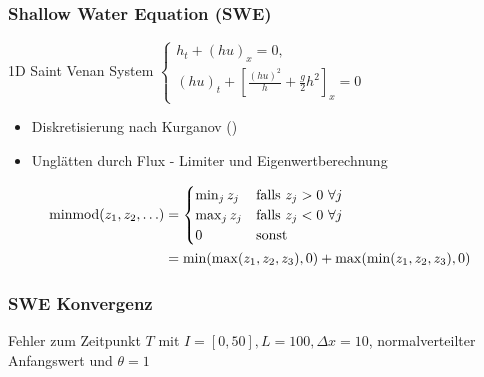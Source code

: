 \begin{frame}[<+->]
\frametitle{Shallow Water Equation (SWE)}
\begin{minipage}{0.45\linewidth}

\end{minipage}
\begin{minipage}{0.54\linewidth}
 \begin{block}{1D Saint Venan System}
     \centering
     $\begin{cases}
 h_t + (hu)_x = 0,\\
 (hu)_t + \left[\frac{(hu)^2}{h} + \frac{g}{2}h^2\right]_x = 0
\end{cases} $
    \end{block}
   \begin{itemize}
    \item Diskretisierung nach Kurganov (\cite{kurganov2007second})
    \item Unglätten durch Flux - Limiter und Eigenwertberechnung
   \end{itemize}                           
\end{minipage}
\pause
\begin{align*}
\operatorname{minmod}(z_1,z_2,\ldots) &= \begin{cases}
                                  \min_j z_j & \text{falls }z_j>0~\forall j\\
                                  \max_j z_j & \text{falls }z_j<0~\forall j\\
                                  0 & \text{sonst}
                                 \end{cases}\\
&= \min(\max(z_1,z_2,z_3),0) + \max(\min(z_1,z_2,z_3),0)                                 
\end{align*}
\end{frame}
% 
% 
% 
% 


\begin{frame}[<+->]
\frametitle{SWE Konvergenz}
\centering
\begin{minipage}{0.49\linewidth}

\end{minipage}
\begin{minipage}{0.49\linewidth}

\end{minipage}
\centering
Fehler zum Zeitpunkt $T$ mit $I=[0,50], L=100,\Delta x = 10$, normalverteilter Anfangswert und $\theta=1$
\end{frame}

